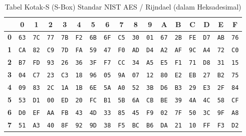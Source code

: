 \documentclass[11pt,a4paper]{article}
\begin{document}
\begin{table}[H]
\centering
\small
\caption{Tabel Kotak-S (S-Box) Standar NIST AES / Rijndael (dalam Heksadesimal)}
\vspace{0.2cm}
\begin{tabular}{|c|cccccccccccccccc|}
\hline
  & \textbf{0} & \textbf{1} & \textbf{2} & \textbf{3} & \textbf{4} & \textbf{5} & \textbf{6} & \textbf{7} & \textbf{8} & \textbf{9} & \textbf{A} & \textbf{B} & \textbf{C} & \textbf{D} & \textbf{E} & \textbf{F} \\
\hline
\textbf{0} & \texttt{63} & \texttt{7C} & \texttt{77} & \texttt{7B} & \texttt{F2} & \texttt{6B} & \texttt{6F} & \texttt{C5} & \texttt{30} & \texttt{01} & \texttt{67} & \texttt{2B} & \texttt{FE} & \texttt{D7} & \texttt{AB} & \texttt{76} \\
\textbf{1} & \texttt{CA} & \texttt{82} & \texttt{C9} & \texttt{7D} & \texttt{FA} & \texttt{59} & \texttt{47} & \texttt{F0} & \texttt{AD} & \texttt{D4} & \texttt{A2} & \texttt{AF} & \texttt{9C} & \texttt{A4} & \texttt{72} & \texttt{C0} \\
\textbf{2} & \texttt{B7} & \texttt{FD} & \texttt{93} & \texttt{26} & \texttt{36} & \texttt{3F} & \texttt{F7} & \texttt{CC} & \texttt{34} & \texttt{A5} & \texttt{E5} & \texttt{F1} & \texttt{71} & \texttt{D8} & \texttt{31} & \texttt{15} \\
\textbf{3} & \texttt{04} & \texttt{C7} & \texttt{23} & \texttt{C3} & \texttt{18} & \texttt{96} & \texttt{05} & \texttt{9A} & \texttt{07} & \texttt{12} & \texttt{80} & \texttt{E2} & \texttt{EB} & \texttt{27} & \texttt{B2} & \texttt{75} \\
\textbf{4} & \texttt{09} & \texttt{83} & \texttt{2C} & \texttt{1A} & \texttt{1B} & \texttt{6E} & \texttt{5A} & \texttt{A0} & \texttt{52} & \texttt{3B} & \texttt{D6} & \texttt{B3} & \texttt{29} & \texttt{E3} & \texttt{2F} & \texttt{84} \\
\textbf{5} & \texttt{53} & \texttt{D1} & \texttt{00} & \texttt{ED} & \texttt{20} & \texttt{FC} & \texttt{B1} & \texttt{5B} & \texttt{6A} & \texttt{CB} & \texttt{BE} & \texttt{39} & \texttt{4A} & \texttt{4C} & \texttt{58} & \texttt{CF} \\
\textbf{6} & \texttt{D0} & \texttt{EF} & \texttt{AA} & \texttt{FB} & \texttt{43} & \texttt{4D} & \texttt{33} & \texttt{85} & \texttt{45} & \texttt{F9} & \texttt{02} & \texttt{7F} & \texttt{50} & \texttt{3C} & \texttt{9F} & \texttt{A8} \\
\textbf{7} & \texttt{51} & \texttt{A3} & \texttt{40} & \texttt{8F} & \texttt{92} & \texttt{9D} & \texttt{38} & \texttt{F5} & \texttt{BC} & \texttt{B6} & \texttt{DA} & \texttt{21} & \texttt{10} & \texttt{FF} & \texttt{F3} & \texttt{D2} \\

\end{tabular}
\end{table}
\end{document}
